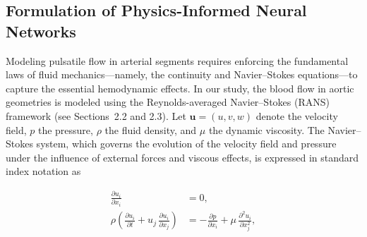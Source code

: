 \documentclass[12pt, a4paper]{article}
\begin{document}



\subsection{Formulation of Physics-Informed Neural Networks}
\label{sec:PINN_Formulation}

Modeling pulsatile flow in arterial segments requires enforcing the fundamental laws of fluid mechanics—namely, the continuity and Navier–Stokes equations—to capture the essential hemodynamic effects. In our study, the blood flow in aortic geometries is modeled using the Reynolds-averaged Navier–Stokes (RANS) framework (see Sections~2.2 and 2.3). Let \(\mathbf{u} = (u,v,w)\) denote the velocity field, \(p\) the pressure, \(\rho\) the fluid density, and \(\mu\) the dynamic viscosity. The Navier–Stokes system, which governs the evolution of the velocity field and pressure under the influence of external forces and viscous effects, is expressed in standard index notation as

\[
\begin{aligned}
\frac{\partial u_i}{\partial x_i} &= 0, \\
\rho\left(\frac{\partial u_i}{\partial t} + u_j\,\frac{\partial u_i}{\partial x_j}\right) &= -\frac{\partial p}{\partial x_i} + \mu\,\frac{\partial^2 u_i}{\partial x_j^2},
\end{aligned}
\tag{3.1}
\]
\end{document}
